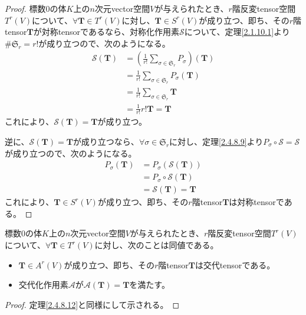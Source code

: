 \documentclass[dvipdfmx]{jsarticle}
\begin{document}
\begin{proof}
標数$0$の体$K$上の$n$次元vector空間$V$が与えられたとき、$r$階反変tensor空間$T^{r}(V)$について、$\forall\mathbf{T} \in T^{r}(V)$に対し、$\mathbf{T} \in S^{r}(V)$が成り立つ、即ち、その$r$階tensor$\mathbf{T}$が対称tensorであるなら、対称化作用素$\mathcal{S}$について、定理\ref{2.1.10.1}より${\#}\mathfrak{S}_{r} = r!$が成り立つので、次のようになる。
\begin{align*}
\mathcal{S}\left( \mathbf{T} \right) &= \left( \frac{1}{r!}\sum_{\sigma \in \mathfrak{S}_{r}} P_{\sigma} \right)\left( \mathbf{T} \right)\\
&= \frac{1}{r!}\sum_{\sigma \in \mathfrak{S}_{r}} {P_{\sigma}\left( \mathbf{T} \right)}\\
&= \frac{1}{r!}\sum_{\sigma \in \mathfrak{S}_{r}} \mathbf{T}\\
&= \frac{1}{r!}r!\mathbf{T} = \mathbf{T}
\end{align*}
これにより、$\mathcal{S}\left( \mathbf{T} \right) = \mathbf{T}$が成り立つ。\par
逆に、$\mathcal{S}\left( \mathbf{T} \right) = \mathbf{T}$が成り立つなら、$\forall\sigma \in \mathfrak{S}_{r}$に対し、定理\ref{2.4.8.9}より$P_{\sigma}\circ \mathcal{S} = \mathcal{S}$が成り立つので、次のようになる。
\begin{align*}
P_{\sigma}\left( \mathbf{T} \right) &= P_{\sigma}\left( \mathcal{S}\left( \mathbf{T} \right) \right)\\
&= P_{\sigma}\circ \mathcal{S}\left( \mathbf{T} \right)\\
&= \mathcal{S}\left( \mathbf{T} \right) = \mathbf{T}
\end{align*}
これにより、$\mathbf{T} \in S^{r}(V)$が成り立つ、即ち、その$r$階tensor$\mathbf{T}$は対称tensorである。
\end{proof}
\begin{thm}\label{2.4.8.13}
標数$0$の体$K$上の$n$次元vector空間$V$が与えられたとき、$r$階反変tensor空間$T^{r}(V)$について、$\forall\mathbf{T} \in T^{r}(V)$に対し、次のことは同値である。
\begin{itemize}
\item
  $\mathbf{T} \in A^{r}(V)$が成り立つ、即ち、その$r$階tensor$\mathbf{T}$は交代tensorである。
\item
  交代化作用素$\mathcal{A}$が$\mathcal{A}\left( \mathbf{T} \right) = \mathbf{T}$を満たす。
\end{itemize}
\end{thm}
\begin{proof} 定理\ref{2.4.8.12}と同様にして示される。
\end{proof}
\end{document}
